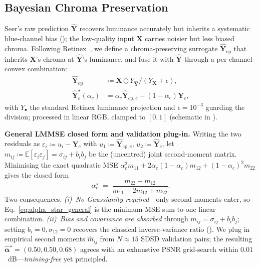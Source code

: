 \subsection{Bayesian Chroma Preservation}\label{sec:method:cp}
Seer's raw prediction $\hat{\mathbf{Y}}$ recovers luminance accurately but inherits a systematic blue-channel bias (); the low-quality input $\mathbf{X}$ carries noisier but less biased chroma. Following Retinex~\citep{retinex_original}, we define a chroma-preserving surrogate $\hat{\mathbf{Y}}_{\text{cp}}$ that inherits $\mathbf{X}$'s chroma at $\hat{\mathbf{Y}}$'s luminance, and fuse it with $\hat{\mathbf{Y}}$ through a per-channel convex combination:
\begin{align}\label{eq:cp_surrogate_fusion}
\hat{\mathbf{Y}}_{\text{cp}} &\coloneqq \mathbf{X}\odot Y_{\hat{\mathbf{Y}}}/(Y_{\mathbf{X}}{+}\epsilon), \\
\hat{\mathbf{Y}}^{\star}_{c}(\alpha_{c}) &= \alpha_{c}\hat{\mathbf{Y}}_{\text{cp},c} + (1{-}\alpha_{c})\hat{\mathbf{Y}}_{c}, \nonumber
\end{align}
with $Y_{\bullet}$ the standard Retinex luminance projection and $\epsilon{=}10^{-3}$ guarding the division; processed in linear RGB, clamped to $[0,1]$ (schematic in ).

\noindent\textbf{General LMMSE closed form and validation plug-in.} Writing the two residuals as $\varepsilon_i\!\coloneqq\!u_i\!-\!\mathbf{Y}_c$ with $u_1\!\coloneqq\!\hat{\mathbf{Y}}_{\text{cp},c}$, $u_2\!\coloneqq\!\hat{\mathbf{Y}}_{c}$, let $m_{ij}\!\coloneqq\!\mathbb{E}[\varepsilon_i\varepsilon_j]\!=\!\sigma_{ij}\!+\!b_ib_j$ be the (uncentred) joint second-moment matrix. Minimising the exact quadratic MSE $\alpha_c^2m_{11}+2\alpha_c(1{-}\alpha_c)m_{12}+(1{-}\alpha_c)^2m_{22}$ gives the closed form
\begin{equation}\label{eq:alpha_star_general}
\alpha_{c}^{\star} \;=\; \frac{m_{22}-m_{12}}{m_{11}-2m_{12}+m_{22}}.
\end{equation}
Two consequences. \emph{(i)~No Gaussianity required}---only second moments enter, so Eq.~\eqref{eq:alpha_star_general} is the minimum-MSE sum-to-one linear combination. \emph{(ii)~Bias and covariance are absorbed} through $m_{ij}\!=\!\sigma_{ij}\!+\!b_ib_j$; setting $b_i\!=\!0,\sigma_{12}\!=\!0$ recovers the classical inverse-variance ratio (). We plug in empirical second moments $\widehat{m}_{ij}$ from $N\!\approx\!15$ SDSD validation pairs; the resulting $\widehat{\boldsymbol{\alpha}}^{\star}\!=\!(0.50,0.50,0.68)$ agrees with an exhaustive PSNR grid-search within $0.01$~dB---\emph{training-free} yet principled.

